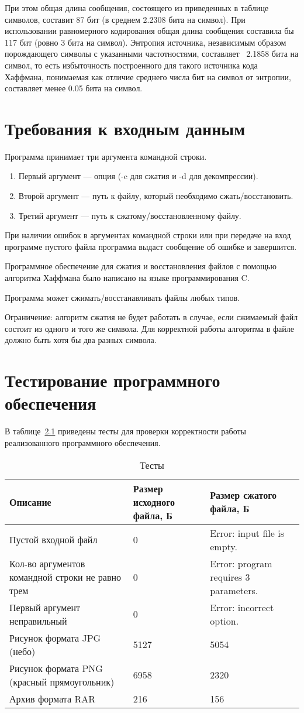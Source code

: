 \documentclass{bmstu}
\begin{document}
При этом общая длина сообщения, состоящего из приведенных в таблице символов, составит 87 бит (в среднем 2.2308 бита на символ). 
При использовании равномерного кодирования общая длина сообщения составила бы 117 бит (ровно 3 бита на символ). 
Энтропия источника, независимым образом порождающего символы с указанными частотностями, составляет ~2.1858 бита на символ, то есть избыточность построенного для такого источника кода Хаффмана, понимаемая как отличие среднего числа бит на символ от энтропии, составляет менее 0.05 бита на символ.

\chapter{Требования к входным данным}

Программа принимает три аргумента командной строки.
\begin{enumerate}
\item Первый аргумент --- опция (-c для сжатия и -d для декомпрессии).
\item Второй аргумент --- путь к файлу, который необходимо сжать/восстановить.
\item Третий аргумент --- путь к сжатому/восстановленному файлу.
\end{enumerate}

При наличии ошибок в аргументах командной строки или при передаче на вход программе пустого файла программа выдаст сообщение об ошибке и завершится.

Программное обеспечение для сжатия и восстановления файлов с помощью алгоритма Хаффмана было написано на языке программирования C.

Программа может сжимать/восстанавливать файлы любых типов.

Ограничение: алгоритм сжатия не будет работать в случае, если сжимаемый файл состоит из одного и того же символа. 
Для корректной работы алгоритма в файле должно быть хотя бы два разных символа.

\chapter{Тестирование программного обеспечения}

В таблице~\ref{tabular:tests} приведены тесты для проверки корректности работы реализованного программного обеспечения.

\begin{table}[H]
\caption{Тесты}
\label{tabular:tests}
\begin{tabular}{|p{4cm}|p{5cm}|p{6cm}|}
\hline
\textbf{Описание} & \textbf{Размер исходного файла, Б} & \textbf{Размер сжатого файла, Б}
\tabularnewline
\hline
Пустой входной файл & 0 & Error: input file is empty.
\tabularnewline
\hline
Кол-во аргументов командной строки не равно трем & 0 & Error: program requires 3 parameters.
\tabularnewline
\hline
Первый аргумент неправильный & 0 & Error: incorrect option.
\tabularnewline
\hline
Рисунок формата JPG (небо) & 5127 & 5054
\tabularnewline
\hline
Рисунок формата PNG (красный прямоугольник) & 6958 & 2320
\tabularnewline
\hline
Архив формата RAR & 216 & 156
\tabularnewline
\hline
\end{tabular}
\end{table}
\end{document}
